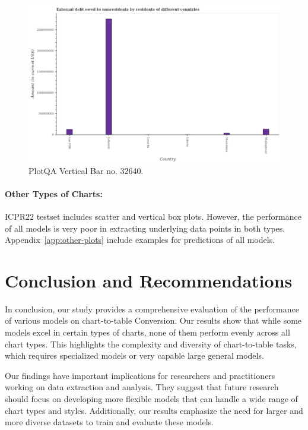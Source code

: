 \documentclass[
	letterpaper, %
]{jdf}
\begin{document}
       \begin{figure}
            \includegraphics{test-sample/plotqa/images/vertical-bar/32640.png}
            \caption{PlotQA Vertical Bar no. 32640.}
            \label{fig:plotqa-vbar-32640}
             \end{figure}
             
             
             

\paragraph{Other Types of Charts:}
ICPR22 testset includes scatter and vertical box plots.
However, the performance of all models is very poor in extracting underlying data points in both types.
Appendix~\ref{app:other-plots} include examples for predictions of all models.

\section{Conclusion and Recommendations}\label{sect:conclusion}
In conclusion, our study provides a comprehensive evaluation of the performance of various models on chart-to-table Conversion.
Our results show that while some models excel in certain types of charts, none of them perform evenly across all chart types.
This highlights the complexity and diversity of chart-to-table tasks, which requires specialized models or very capable large general models.

Our findings have important implications for researchers and practitioners working on data extraction and analysis.
They suggest that future research should focus on developing more flexible models that can handle a wide range  of chart types and styles.
Additionally, our results emphasize the need for larger and more diverse datasets to train and evaluate these models.
\end{document}
